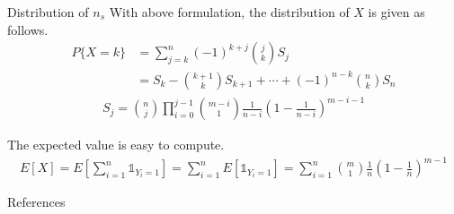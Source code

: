 \documentclass[10pt]{beamer}
\begin{document}
\begin{frame}{Distribution of $n_s$}
	With above formulation, the distribution of $X$ is given as follows. \\ \cite[p.74-76]{ross2014introduction}
	\begin{align*}
		P\lbrace X = k \rbrace 
			&= \sum_{j=k}^n  (-1)^{k+j}\binom{j}{k}S_j \\ 
			&= S_k - \binom{k+1}{k}S_{k+1}+\cdots + (-1)^{n-k}\binom{n}{k}S_{n} 
	\end{align*}	
	\begin{align*}
		S_j = \binom {n}{j} \prod_{i=0}^{j-1} \binom{m-i}{1}\frac{1}{n-i} (1-\frac{1}{n-i})^{m-i-1} \nonumber
	\end{align*}
	
	The expected value is easy to compute.
	\begin{align}
	E[X] = E[\sum_{i=1}^n\mathds{1}_{Y_i = 1}] = \sum_{i=1}^nE[\mathds{1}_{Y_i = 1}] = \sum_{i=1}^n\binom{m}{1}\frac{1}{n} (1-\frac{1}{n})^{m-1}
	\label{expt_ns}
	\end{align}
\end{frame}

\begin{frame}[allowframebreaks]{References}
    
    
\end{frame}

    
\end{document}
